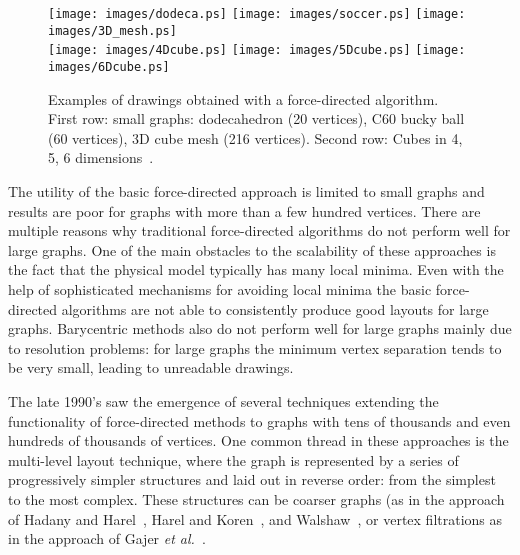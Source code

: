 \documentclass[notitlepage,letter,11pt]{article}
\begin{document}
\begin{figure}[t]
\begin{center}
\texttt{[image: images/dodeca.ps]}
\texttt{[image: images/soccer.ps]}
\texttt{[image: images/3D\_mesh.ps]}\\
\texttt{[image: images/4Dcube.ps]}
\texttt{[image: images/5Dcube.ps]}
\texttt{[image: images/6Dcube.ps]}
\end{center}
\caption{\small\sf Examples of drawings obtained with a force-directed algorithm. First row: small graphs:
  dodecahedron (20 vertices), C60 bucky ball (60 vertices), 3D cube
  mesh (216 vertices). Second row: Cubes in 4, 5, 6 dimensions~\cite{gk-grip-00}.
}
\label{fd:fig:fd}
\end{figure}

The utility of the basic force-directed approach is limited to small
graphs and results are poor for graphs with more than a few hundred
vertices. There are multiple reasons why traditional force-directed
algorithms do not perform well for large graphs. One of the main
obstacles to the scalability of these approaches is the fact that the
physical model typically has many local minima. Even with the help of
sophisticated mechanisms for avoiding local minima the basic
force-directed algorithms are not able to consistently produce good
layouts for large graphs. Barycentric methods also do not perform well
for large graphs mainly due to resolution problems: for large graphs
the minimum vertex separation tends to be very small, leading to
unreadable drawings.

The late 1990's saw the emergence of several techniques extending the
functionality of force-directed methods to graphs with tens of
thousands and even hundreds of thousands of vertices. One common
thread in these approaches is the multi-level layout technique, where
the graph is represented by a series of progressively simpler
structures and laid out in reverse order: from the simplest to the
most complex. These structures can be coarser graphs (as in the
approach of Hadany and Harel~\cite{hh-msadg-99}, Harel and
Koren~\cite{hk-fmsmd-j-02}, and Walshaw~\cite{w-mafdgd-j-03}, or
vertex filtrations as in the approach of Gajer {\em et al.}~\cite{ggk-afmda-00j}. 
\end{document}
